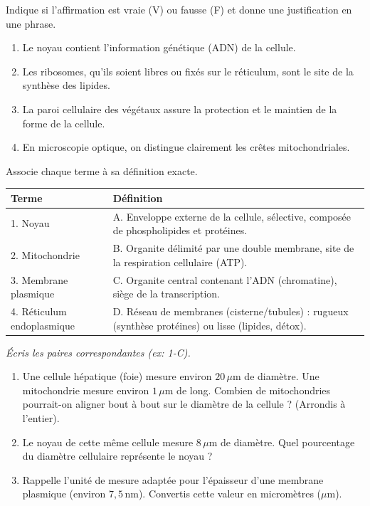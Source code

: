 \documentclass[11pt]{article}
\begin{document}
\begin{exercice}
Indique si l'affirmation est vraie (V) ou fausse (F) et donne une justification en une phrase.
\begin{enumerate}
    \item Le noyau contient l'information génétique (ADN) de la cellule.
    \item Les ribosomes, qu'ils soient libres ou fixés sur le réticulum, sont le site de la synthèse des lipides.
    \item La paroi cellulaire des végétaux assure la protection et le maintien de la forme de la cellule.
    \item En microscopie optique, on distingue clairement les crêtes mitochondriales.
\end{enumerate}
\end{exercice}

\begin{exercice}
Associe chaque terme à sa définition exacte.
\begin{center}
\begin{tabularx}{\linewidth}{|l|X|}\hline
\textbf{Terme} & \textbf{Définition} \\ \hline
1. Noyau & A. Enveloppe externe de la cellule, sélective, composée de phospholipides et protéines. \\ \hline
2. Mitochondrie & B. Organite délimité par une double membrane, site de la respiration cellulaire (ATP). \\ \hline
3. Membrane plasmique & C. Organite central contenant l'ADN (chromatine), siège de la transcription. \\ \hline
4. Réticulum endoplasmique & D. Réseau de membranes (cisterne/tubules) : rugueux (synthèse protéines) ou lisse (lipides, détox). \\ \hline
\end{tabularx}
\end{center}
\textit{Écris les paires correspondantes (ex: 1-C).}
\end{exercice}

\begin{exercice}
\begin{enumerate}
    \item Une cellule hépatique (foie) mesure environ $20\,\mu\text{m}$ de diamètre. Une mitochondrie mesure environ $1\,\mu\text{m}$ de long. Combien de mitochondries pourrait-on aligner bout à bout sur le diamètre de la cellule ? (Arrondis à l'entier).
    \item Le noyau de cette même cellule mesure $8\,\mu\text{m}$ de diamètre. Quel pourcentage du diamètre cellulaire représente le noyau ?
    \item Rappelle l'unité de mesure adaptée pour l'épaisseur d'une membrane plasmique (environ $7,5\,\text{nm}$). Convertis cette valeur en micromètres ($\mu\text{m}$).
\end{enumerate}
\end{exercice}
\end{document}
